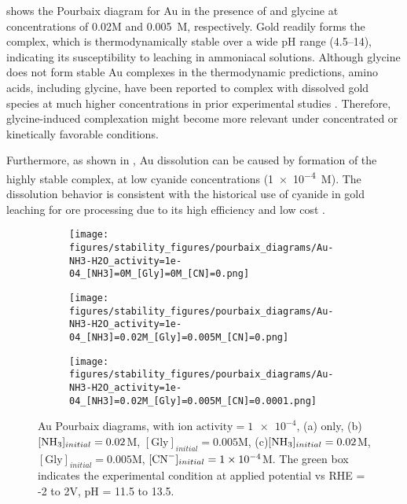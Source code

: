 \documentclass[journal=jacsat,manuscript=article]{achemso}
\begin{document}
 shows the Pourbaix diagram for Au in the presence of  and glycine at concentrations of 0.02M and 0.005~M, respectively. Gold readily forms the \ce{[Au(NH3)_2]^+} complex, which is thermodynamically stable over a wide pH range (4.5–14), indicating its susceptibility to leaching in ammoniacal solutions. Although glycine does not form stable Au complexes in the thermodynamic predictions, amino acids, including glycine, have been reported to complex with dissolved gold species at much higher concentrations in prior experimental studies \cite{Sarvar2023ApplicationStructure, Brown1982TheGold}. Therefore, glycine-induced complexation might become more relevant under concentrated or kinetically favorable conditions.

Furthermore, as shown in , Au dissolution can be caused by formation of the highly stable \ce{[Au(CN)_2]^-} complex, at low cyanide concentrations (\num{1e-4}~M). The dissolution behavior is consistent with the historical use of cyanide in gold leaching for ore processing due to its high efficiency and low cost \cite{Hilson2006AlternativesFuture, young2001cyanide}.

\begin{figure}[htbp]
    \centering
    \begin{subfigure}[b]{0.3\textwidth}
        \subcaption{}\label{fig:Au_Pourbaix_H2O}
        \texttt{[image: figures/stability\_figures/pourbaix\_diagrams/Au-NH3-H2O\_activity=1e-04\_[NH3]=0M\_[Gly]=0M\_[CN]=0.png]}
    \end{subfigure}
    \begin{subfigure}[b]{0.3\textwidth}
        \subcaption{}\label{fig:Au_Pourbaix_NH3_Gly}
        \texttt{[image: figures/stability\_figures/pourbaix\_diagrams/Au-NH3-H2O\_activity=1e-04\_[NH3]=0.02M\_[Gly]=0.005M\_[CN]=0.png]}
    \end{subfigure}
    \begin{subfigure}[b]{0.3\textwidth}
        \subcaption{}\label{fig:Au_Pourbaix_NH3_Gly_CN}
        \texttt{[image: figures/stability\_figures/pourbaix\_diagrams/Au-NH3-H2O\_activity=1e-04\_[NH3]=0.02M\_[Gly]=0.005M\_[CN]=0.0001.png]}
    \end{subfigure}
    \caption{Au Pourbaix diagrams, with $\text{ion activity}=\num{1e-4}$, (a) only, (b)$[\ce{NH3}]_{initial}= 0.02$M, $[\text{Gly}]_{initial}=0.005$M, (c)$[\ce{NH3}]_{initial}= 0.02$M, $[\text{Gly}]_{initial}=0.005$M,  $[\ce{CN-}]_{initial}=\num{1e-4}$M. The green box indicates the experimental condition at applied potential vs RHE = -2 to 2V, pH = 11.5 to 13.5.}
    \label{fig:Au_Pourbaix}
\end{figure}
\end{document}
